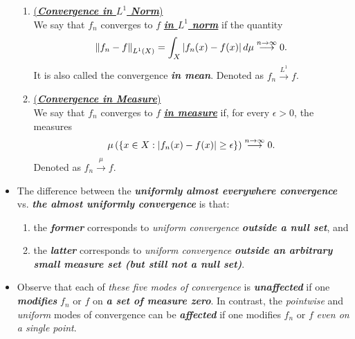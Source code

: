 \documentclass[11pt]{article}
\begin{document}
\begin{itemize}
\begin{remark}
\begin{enumerate}
\item \begin{definition}  \underline{(\emph{\textbf{Convergence in $L^{1}$ Norm}})}\\
We say that $f_n$ converges to $f$  \underline{\emph{\textbf{in $L^1$ norm}}} if the quantity 
\begin{align*}
\left\|f_n - f\right\|_{L^{1}(X)} =  \int_{X}\left\lvert  f_n(x) - f(x) \right\rvert d\mu  \stackrel{n\rightarrow \infty}{\longrightarrow} 0.
\end{align*}
It is also called the convergence \emph{\textbf{in mean}}. Denoted as $f_{n}\stackrel{L^{1}}{\rightarrow} f$.
\end{definition} 

\item  \begin{definition}   \underline{(\emph{\textbf{Convergence in Measure}})}\\
We say that $f_n$ converges to $f$  \underline{\emph{\textbf{in measure}}} if, for every $\epsilon> 0$,  the measures
\begin{align*}
\mu\left( \left\{x \in X: \left\lvert f_n(x) - f(x) \right\rvert \ge \epsilon\right\}\right)\stackrel{n\rightarrow \infty}{\longrightarrow} 0.
\end{align*} Denoted as $f_{n}\stackrel{\mu}{\rightarrow} f$.
\end{definition} 
\end{enumerate}
\end{remark}

\item \begin{remark}
The difference between the \emph{\textbf{uniformly almost everywhere convergence}} vs. \emph{\textbf{the almost uniformly convergence}} is that:
\begin{enumerate}
\item the \emph{\textbf{former}} corresponds to \emph{uniform convergence} \emph{\textbf{outside a null set}}, and
\item the \emph{\textbf{latter}} corresponds to \emph{uniform convergence} \emph{\textbf{outside an arbitrary small measure set (but still not a null set)}}.
\end{enumerate}
\end{remark}

\item \begin{remark}
Observe that each of \emph{these five modes of convergence} is \emph{\textbf{unaffected}} if one \emph{\textbf{modifies}} $f_n$ or $f$ on \emph{\textbf{a set of measure zero}}. In contrast, the \emph{pointwise} and \emph{uniform} modes of convergence can be \emph{\textbf{affected}} if one modifies $f_n$ or $f$ \emph{even on a single point}.
\end{remark}


\end{itemize}
\end{document}
